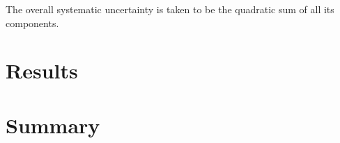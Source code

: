 \begin{description}[wide=\parindent]


\end{description}

The overall systematic uncertainty is taken to be the quadratic sum of all its components.


\section{Results}
\label{s_top_mass:results}

\section{Summary}
\label{s_top_mass:summary}




